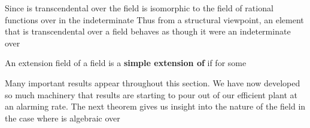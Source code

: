 \documentclass[11pt,oneside]{article}
\begin{document}
\begin{BookBody}
 Since \BookInline{\pi } is transcendental over  the field  is isomorphic to the field  of rational functions over  in the indeterminate  Thus from a structural viewpoint, an element that is transcendental over a field  behaves as though it were an indeterminate over \BookEnd{\blacktriangle}

 An extension field  of a field  is a\textbf{ simple extension of}  if  for some \BookEnd{\blacksquare}

Many important results appear throughout this section. We have now developed so much machinery that results are starting to pour out of our efficient plant at an alarming 
rate. The next theorem gives us insight into the nature of the field  in the case where \BookInline{\alpha } is algebraic over 

\end{BookBody}

\BookNarrativetrue
\end{document}
